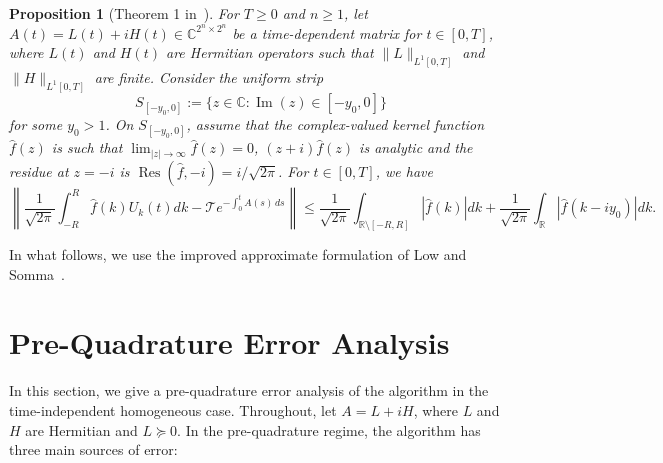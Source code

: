 \documentclass[10pt,reqno]{article}
\numberwithin{equation}{section}
\theoremstyle{plain}
\newtheorem{prop}[thm]{Proposition}
\theoremstyle{definition}
\newcommand{\C}{\mathbb{C}}
\newcommand{\R}{\mathbb{R}}
\begin{document}
\begin{prop}[Theorem 1 in~\cite{low2025optimallchs}]
\label{somma-lchs}
For $T \geq 0$ and $n \geq 1$, let $A(t) = L(t) + iH(t) \in \C^{2^n \times 2^n}$ be a time-dependent matrix for $t \in [0,T]$, where $L(t)$ and $H(t)$ are Hermitian operators such that $\|L\|_{L^1[0,T]}$ and $\|H\|_{L^1[0,T]}$ are finite. Consider  the uniform strip
\begin{equation}
S_{[-y_0,0]} := \{ z \in \mathbb{C} : \operatorname{Im}(z) \in [-y_0,0] \}
\end{equation}
for some $y_0 > 1$. On $S_{[-y_0,0]}$, assume that the complex-valued kernel function $\hat{f}(z)$ is such that  $\lim_{|z| \to \infty} \hat{f}(z) = 0$, $(z+i)\hat{f}(z)$ is analytic and the residue at $z=-i$ is $\operatorname{Res}(\hat{f}, -i) = i/\sqrt{2\pi}$. For $t \in [0,T]$, we have
\begin{equation}\label{low-somma-thm-1}
\left \| \frac{1}{\sqrt{2 \pi}} \int_{-R}^R \hat f(k) U_k(t) dk - \mathcal{T}e^{-\int_0^t A(s)\,ds} \right \| \leq \frac{1}{\sqrt{2 \pi}} \int_{\R \setminus [-R,R]} | \hat f(k) | dk + \frac{1}{\sqrt{2 \pi}} \int_{\R} | \hat f(k-iy_0) | dk.
\end{equation}
\end{prop}

In what follows, we use the improved approximate formulation of Low and Somma~\cite{low2025optimallchs}.

\section{Pre-Quadrature Error Analysis}\label{sec:alg-err-analysis}
In this section, we give a pre-quadrature error analysis of the algorithm in the time-independent homogeneous case. Throughout, let \(A=L+iH\), where \(L\) and \(H\) are Hermitian and \(L\succeq 0\). In the pre-quadrature regime, the algorithm has three main sources of error:
\end{document}
